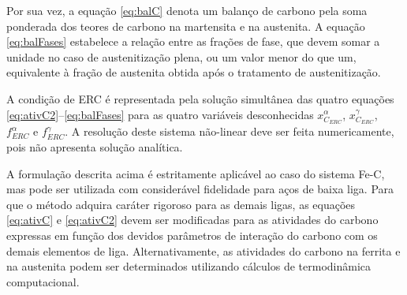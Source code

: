 Por sua vez, a equação \ref{eq:balC} denota um balanço de carbono pela soma ponderada dos teores de carbono na martensita e na austenita. A equação \ref{eq:balFases} estabelece a relação entre as frações de fase, que devem somar a unidade no caso de austenitização plena, ou um valor menor do que um, equivalente à fração de austenita obtida após o tratamento de austenitização.

A condição de ERC é representada pela solução simultânea das quatro equações \ref{eq:ativC2}--\ref{eq:balFases} para as quatro variáveis desconhecidas $x_{C_{ERC}}^\alpha$, $x_{C_{ERC}}^\gamma$, $f_{ERC}^\alpha$ e $f_{ERC}^\gamma$. A resolução deste sistema não-linear deve ser feita numericamente, pois não apresenta solução analítica.

A formulação descrita acima é estritamente aplicável ao caso do sistema Fe-C, mas pode ser utilizada com considerável fidelidade para aços de baixa liga\cite{Speer2003}. Para que o método adquira caráter rigoroso para as demais ligas, as equações \ref{eq:ativC} e \ref{eq:ativC2} devem ser modificadas para as atividades do carbono expressas em função dos devidos parâmetros de interação do carbono com os demais elementos de liga. Alternativamente, as atividades do carbono na ferrita e na austenita podem ser determinados utilizando cálculos de termodinâmica computacional.





